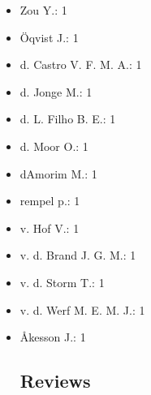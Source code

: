 \begin{itemize}
\item Zou Y.: 1
\item \"{O}qvist J.: 1
\item d. Castro V. F. M. A.: 1
\item d. Jonge M.: 1
\item d. L. Filho B. E.: 1
\item d. Moor O.: 1
\item dAmorim M.: 1
\item rempel p.: 1
\item v. Hof V.: 1
\item v. d. Brand J. G. M.: 1
\item v. d. Storm T.: 1
\item v. d. Werf M. E. M. J.: 1
\item Åkesson J.: 1

\subsection{Reviews}

\end{itemize}
